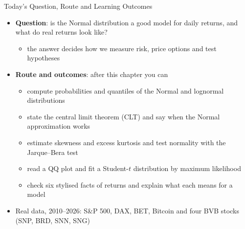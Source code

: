 \begin{frame}{Today's Question, Route and Learning Outcomes}
\itemsize{\small}
\begin{itemize}
    \item \textbf{Question}: is the Normal distribution a good model for daily returns, and what do real returns look like?
    \begin{itemize}
        \item the answer decides how we measure risk, price options and test hypotheses
    \end{itemize}
    \item \textbf{Route and outcomes}: after this chapter you can
    \begin{itemize}
        \item compute probabilities and quantiles of the Normal and lognormal distributions
        \item state the central limit theorem (CLT) and say when the Normal approximation works
        \item estimate skewness and excess kurtosis and test normality with the Jarque--Bera test
        \item read a QQ plot and fit a Student-$t$ distribution by maximum likelihood
        \item check six stylised facts of returns  and explain what each means for a model
    \end{itemize}
    \item Real data, 2010--2026: S\&P 500, DAX, BET, Bitcoin and four BVB stocks (SNP, BRD, SNN, SNG)
\end{itemize}
\end{frame}

